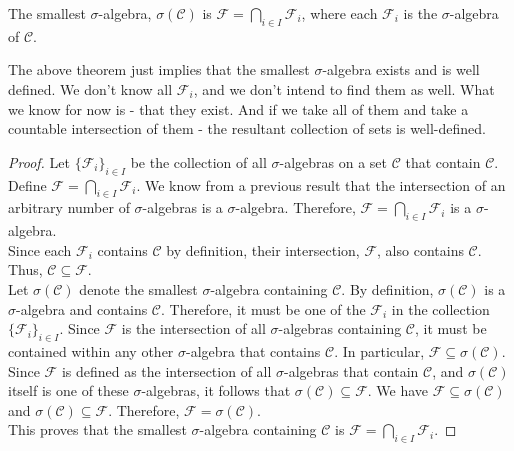 \begin{theorem}
    The smallest $\sigma$-algebra, $\sigma(\mathcal{C})$ is $\mathcal{F} = \bigcap_{i \in I} \mathcal{F}_i$, where each $\mathcal{F}_i$ is the $\sigma$-algebra of $\mathcal{C}$.  
 \end{theorem}
 
 The above theorem just implies that the smallest $\sigma$-algebra exists and is well defined. We don't know all $\mathcal{F}_i$, and we don't intend to find them as well. What we know for now is - that they exist. And if we take all of them and take a countable intersection of them - the resultant collection of sets is well-defined. 
 
 \begin{proof}
    Let $\{ \mathcal{F}_i \}_{i \in I}$ be the collection of all $\sigma$-algebras on a set $\mathcal{C}$ that contain $\mathcal{C}$. Define $\mathcal{F} = \bigcap_{i \in I} \mathcal{F}_i$. We know from a previous result that the intersection of an arbitrary number of $\sigma$-algebras is a $\sigma$-algebra. Therefore, $\mathcal{F} = \bigcap_{i \in I} \mathcal{F}_i$ is a $\sigma$-algebra.\\
 
    Since each $\mathcal{F}_i$ contains $\mathcal{C}$ by definition, their intersection, $\mathcal{F}$, also contains $\mathcal{C}$. Thus, $\mathcal{C} \subseteq \mathcal{F}$.\\
 
    Let $\sigma(\mathcal{C})$ denote the smallest $\sigma$-algebra containing $\mathcal{C}$. By definition, $\sigma(\mathcal{C})$ is a $\sigma$-algebra and contains $\mathcal{C}$. Therefore, it must be one of the $\mathcal{F}_i$ in the collection $\{\mathcal{F}_i\}_{i \in I}$. Since $\mathcal{F}$ is the intersection of all $\sigma$-algebras containing $\mathcal{C}$, it must be contained within any other $\sigma$-algebra that contains $\mathcal{C}$. In particular, $\mathcal{F} \subseteq \sigma(\mathcal{C})$.\\
 
    Since $\mathcal{F}$ is defined as the intersection of all $\sigma$-algebras that contain $\mathcal{C}$, and $\sigma(\mathcal{C})$ itself is one of these $\sigma$-algebras, it follows that $\sigma(\mathcal{C}) \subseteq \mathcal{F}$. We have $\mathcal{F} \subseteq \sigma(\mathcal{C})$ and $\sigma(\mathcal{C}) \subseteq \mathcal{F}$. Therefore, $\mathcal{F} = \sigma(\mathcal{C})$.\\
    
    This proves that the smallest $\sigma$-algebra containing $\mathcal{C}$ is $\mathcal{F} = \bigcap_{i \in I} \mathcal{F}_i$.
 \end{proof}
 
